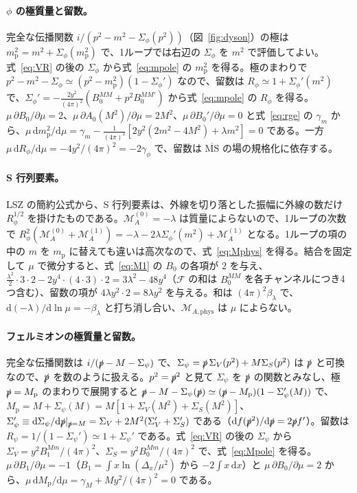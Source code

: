 \documentclass[a4paper,10pt]{ltjsarticle}
\newcommand{\dd}{\mathrm{d}}
\newcommand{\MSbar}{\overline{\mathrm{MS}}}
\begin{document}
\paragraph{$\phi$ の極質量と留数。}完全な伝播関数 $i/(p^2-m^2-\Sigma_\phi(p^2))$（図~\ref{fig:dyson}）の極は $m_{\mathrm p}^2=m^2+\Sigma_\phi(m_{\mathrm p}^2)$ で、1ループでは右辺の $\Sigma_\phi$ を $m^2$ で評価してよい。式~\eqref{eq:VR} の後の $\Sigma_\phi$ から式~\eqref{eq:mpole} の $m_{\mathrm p}^2$ を得る。極のまわりで $p^2-m^2-\Sigma_\phi\simeq(p^2-m_{\mathrm p}^2)(1-\Sigma_\phi')$ なので、留数は $R_\phi\simeq1+\Sigma_\phi'(m^2)$ で、$\Sigma_\phi'=-\frac{2y^2}{(4\pi)^2}(B_0^{MM}+p^2B_0^{MM\prime})$ から式~\eqref{eq:mpole} の $R_\phi$ を得る。$\mu\,\partial B_0/\partial\mu=2$、$\mu\,\partial A_0(M^2)/\partial\mu=2M^2$、$\mu\,\partial B_0'/\partial\mu=0$ と式~\eqref{eq:rge} の $\gamma_m$ から、$\mu\,\dd m_{\mathrm p}^2/\dd\mu=\gamma_m-\frac{1}{(4\pi)^2}[2y^2(2m^2-4M^2)+\lambda m^2]=0$ である。一方 $\mu\,\dd R_\phi/\dd\mu=-4y^2/(4\pi)^2=-2\gamma_\phi$ で、留数は $\MSbar$ の場の規格化に依存する。

\paragraph{S 行列要素。}LSZ の簡約公式から、S 行列要素は、外線を切り落とした振幅に外線の数だけ $R_\phi^{1/2}$ を掛けたものである。$\mathcal M_A^{(0)}=-\lambda$ は質量によらないので、1ループの次数で $R_\phi^2(\mathcal M_A^{(0)}+\mathcal M_A^{(1)})=-\lambda-2\lambda\Sigma_\phi'(m^2)+\mathcal M_A^{(1)}$ となる。1ループの項の中の $m$ を $m_{\mathrm p}$ に替えても違いは高次なので、式~\eqref{eq:Mphys} を得る。結合を固定して $\mu$ で微分すると、式~\eqref{eq:M1} の $B_0$ の各項が $2$ を与え、$\frac{\lambda^2}{2}\cdot3\cdot2-2y^4\cdot(4\cdot3)\cdot2=3\lambda^2-48y^4$（$\mathcal F$ の和は $B_0^{MM}$ を各チャンネルにつき4つ含む）、留数の項が $4\lambda y^2\cdot2=8\lambda y^2$ を与える。和は $(4\pi)^2\beta_\lambda$ で、$\dd(-\lambda)/\dd\ln\mu=-\beta_\lambda$ と打ち消し合い、$\mathcal M_{A,\mathrm{phys}}$ は $\mu$ によらない。

\paragraph{フェルミオンの極質量と留数。}完全な伝播関数は $i/(\slashed p-M-\Sigma_\psi)$ で、$\Sigma_\psi=\slashed p\,\Sigma_V(p^2)+M\Sigma_S(p^2)$ は $\slashed p$ と可換なので、$\slashed p$ を数のように扱える。$p^2=\slashed p^2$ と見て $\Sigma_\psi$ を $\slashed p$ の関数とみなし、極 $\slashed p=M_{\mathrm p}$ のまわりで展開すると $\slashed p-M-\Sigma_\psi(\slashed p)\simeq(\slashed p-M_{\mathrm p})(1-\Sigma_\psi'(M))$ で、$M_{\mathrm p}=M+\Sigma_\psi(M)=M[1+\Sigma_V(M^2)+\Sigma_S(M^2)]$、$\Sigma_\psi'\equiv\dd\Sigma_\psi/\dd\slashed p|_{\slashed p=M}=\Sigma_V+2M^2(\Sigma_V'+\Sigma_S')$ である（$\dd f(\slashed p^2)/\dd\slashed p=2\slashed pf'$）。留数は $R_\psi=1/(1-\Sigma_\psi')\simeq1+\Sigma_\psi'$ である。式~\eqref{eq:VR} の後の $\Sigma_\psi$ から $\Sigma_V=y^2B_1^{Mm}/(4\pi)^2$、$\Sigma_S=y^2B_0^{Mm}/(4\pi)^2$ で、式~\eqref{eq:Mpole} を得る。$\mu\,\partial B_1/\partial\mu=-1$（$B_1=\int x\ln(\Delta_x/\mu^2)$ から $-2\int x\,\dd x$）と $\mu\,\partial B_0/\partial\mu=2$ から、$\mu\,\dd M_{\mathrm p}/\dd\mu=\gamma_M+My^2/(4\pi)^2=0$ である。
\end{document}
